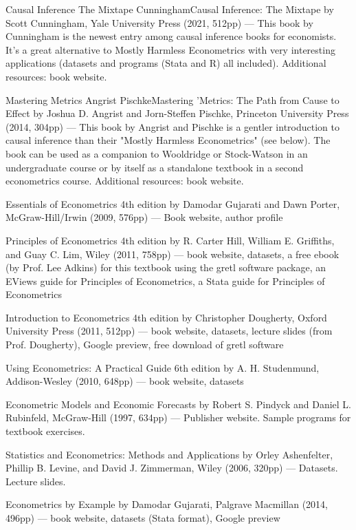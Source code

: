 Causal Inference The Mixtape CunninghamCausal Inference: The Mixtape by Scott Cunningham, Yale University Press (2021, 512pp) --- This book by Cunningham is the newest entry among causal inference books for economists. It's a great alternative to Mostly Harmless Econometrics with very interesting applications (datasets and programs (Stata and R) all included).   Additional resources:  book website.

Mastering Metrics Angrist PischkeMastering 'Metrics: The Path from Cause to Effect by Joshua D. Angrist and Jorn-Steffen Pischke, Princeton University Press (2014, 304pp) --- This book by Angrist and Pischke is a gentler introduction to causal inference than their "Mostly Harmless Econometrics" (see below). The book can be used as a companion to Wooldridge or Stock-Watson in an undergraduate course or by itself as a standalone textbook in a second econometrics course.   Additional resources:  book website.

Essentials of Econometrics 4th edition by Damodar Gujarati and Dawn Porter, McGraw-Hill/Irwin (2009, 576pp) --- Book website, author profile

Principles of Econometrics 4th edition by R. Carter Hill, William E. Griffiths, and Guay C. Lim, Wiley (2011, 758pp) --- book website, datasets, a free ebook (by Prof. Lee Adkins) for this textbook using the gretl software package, an EViews guide for Principles of Econometrics, a Stata guide for Principles of Econometrics

Introduction to Econometrics 4th edition by Christopher Dougherty, Oxford University Press (2011, 512pp) --- book website, datasets, lecture slides (from Prof. Dougherty), Google preview, free download of gretl software

Using Econometrics: A Practical Guide 6th edition by A. H. Studenmund, Addison-Wesley (2010, 648pp) --- book website, datasets

Econometric Models and Economic Forecasts by Robert S. Pindyck and Daniel L. Rubinfeld, McGraw-Hill (1997, 634pp) --- Publisher website.  Sample programs for textbook exercises.

Statistics and Econometrics: Methods and Applications by Orley Ashenfelter, Phillip B. Levine, and David J. Zimmerman, Wiley (2006, 320pp) --- Datasets.  Lecture slides.

Econometrics by Example by Damodar Gujarati, Palgrave Macmillan (2014, 496pp) --- book website, datasets (Stata format), Google preview

